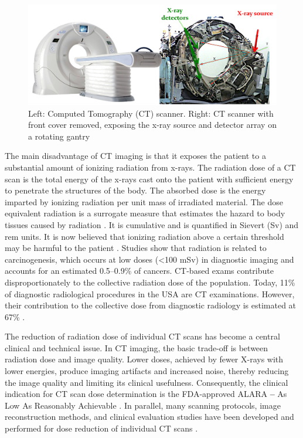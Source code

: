 \begin{figure}[t]
    \centering
    \includegraphics[width=15cm]{figures/CT_machine.png}
    \caption{\small{Left: Computed Tomography (CT) scanner. Right: CT scanner with front cover removed, exposing the x-ray source and detector array on a rotating gantry}}
    \label{fig:figures/CT_machine.png}
\end{figure}

The main disadvantage of CT imaging is that it exposes the patient to a substantial amount of ionizing radiation from x-rays. The radiation dose of a CT scan is the total energy of the x-rays cast onto the patient with sufficient energy to penetrate the structures of the body. The absorbed dose is the energy imparted by ionizing radiation per unit mass of irradiated material. The dose equivalent radiation is a surrogate measure that estimates the hazard to body tissues caused by radiation \cite{mettler2000ct, goo2017dual}. It is cumulative and is quantified in Sievert (Sv) and rem units.
It is now believed that ionizing radiation above a certain threshold may be harmful to the patient \cite{hall2008cancer, davies2011risks, kalra2004strategies}. Studies show that radiation is related to carcinogenesis, which occurs at low doses (\textless 100 mSv) in diagnostic imaging and accounts for an estimated 0.5--0.9\% of cancers. CT-based exams contribute disproportionately to the collective radiation dose of the population. Today, 11\% of diagnostic radiological procedures in the USA are CT examinations. However, their contribution to the collective dose from diagnostic radiology is estimated at 67\% \cite{mettler2000ct}.

The reduction of radiation dose of individual CT scans has become a central clinical and technical issue. In CT imaging, the basic trade-off is between radiation dose and image quality. Lower doses, achieved by fewer X-rays with lower energies, produce imaging artifacts and increased noise, thereby reducing the image quality and limiting its clinical usefulness. Consequently, the clinical indication for CT scan dose determination is the FDA-approved ALARA \textbf{--} As Low As Reasonably Achievable \cite{newman2011alara}. In parallel, many scanning protocols, image reconstruction methods, and clinical evaluation studies have been developed and performed for dose reduction of individual CT scans \cite{shtok2013learned, moore2009adaptive}.

